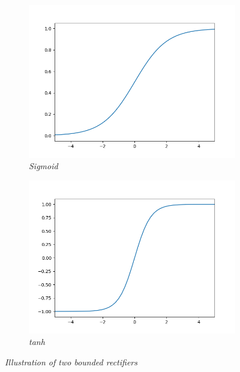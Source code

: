 \documentclass{article}
\begin{document}
            \begin{figure}
                \begin{subfigure}{.49\linewidth}
                    \centering
                    \includegraphics[width=\linewidth]{pics/act-sigmoid.png}
                    \caption{\textit{Sigmoid}}
                \end{subfigure}
                \begin{subfigure}{.49\linewidth}
                    \centering
                    \includegraphics[width=\linewidth]{pics/act-tanh.png}
                    \caption{\textit{tanh}}
                \end{subfigure}
                \caption{\textit{Illustration of two bounded rectifiers}}
                \label{fig:act-sigmoids}
            \end{figure}
\end{document}
